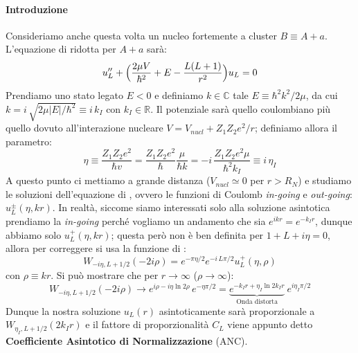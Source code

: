 \paragraph{Introduzione}
Consideriamo anche questa volta un nucleo fortemente a cluster $B\equiv A+a$. L'equazione di \Sch{} ridotta per $A+a$ sarà:
$$u_L'' + \Bigl ( \frac{2\mu V}{\hbar^2} + E - \frac{L(L+1)}{r^2} \Bigr )u_L =0$$
Prendiamo uno stato legato $E<0$ e definiamo $k\in \mathbb{C}$ tale $E\equiv \hbar^2 k^2 / 2\mu$, da cui $k = i\, \sqrt{2\mu |E|/\hbar^2} \equiv i\,k_I$ con $k_I\in \mathbb{R}$.%
Il potenziale sarà quello coulombiano più quello dovuto all'interazione nucleare $V=V_{nucl} + Z_1Z_2 e^2 /r$; definiamo allora il parametro:
$$\eta \equiv \frac{Z_1Z_2 e^2}{\hbar v} = \frac{Z_1Z_2 e^2}{\hbar}\frac{\mu}{\hbar k} = - i \, \frac{Z_1Z_2 e^2\mu}{\hbar^2 k_I} \equiv i\, \eta_I$$
A questo punto ci mettiamo a grande distanza ($V_{nucl} \simeq 0$ per $r>R_N$) e studiamo le soluzioni dell'equazione di \Sch{}, ovvero le funzioni di Coulomb \textit{in-going} e \textit{out-going}: $u^\pm_L (\eta,kr)$. In realtà, siccome siamo interessati solo alla soluzione asintotica prendiamo la \textit{in-going} perché vogliamo un andamento che sia $e^{ikr}=e^{-k_I r}$, dunque abbiamo solo $u^+_L(\eta,kr)$; questa però non è ben definita per $1+L+i\eta =0$, allora per correggere si usa la funzione di \Wh{}:
$$W_{-i\eta,L+1/2}(-2i\rho) = e^{-\pi\eta/2}e^{-i\,L\pi/2} u^+_L(\eta,\rho)$$
con $\rho\equiv kr$. Si può mostrare che per $r\to\infty$ ($\rho\to\infty$):
$$W_{-i\eta,L+1/2}(-2i\rho) \to e^{i\rho-i\eta\ln{2\rho}}\, e^{-\eta\pi/2} = \underbrace{e^{-k_Ir + \eta_I \ln{2k_Ir}}}_\text{Onda distorta}\: e^{i\eta_I\pi/2}$$
Dunque la nostra soluzione $u_L(r)$ asintoticamente sarà proporzionale a $W_{\eta_I,L+1/2}(2k_I r)$ e il fattore di proporzionalità $C_L$ viene appunto detto \textbf{Coefficiente Asintotico di Normalizzazione} (ANC).

